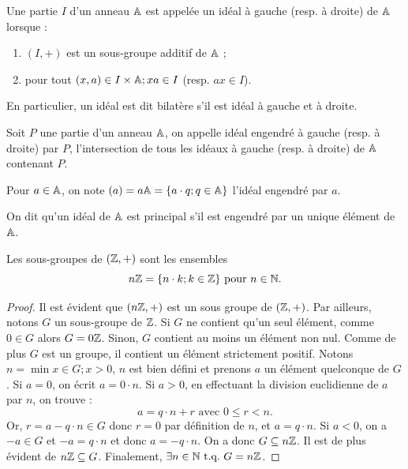 \begin{defn}[Idéal]
Une partie $I$ d'un anneau $\mathbb{A}$ est appelée un idéal à gauche (resp. à droite) de $\mathbb{A}$ lorsque :
\begin{enumerate}[label=(\roman*)]
\item $(I,+)$ est un sous-groupe additif de $\mathbb{A}$ ;
\item pour tout $(x, a) \in I \times \mathbb{A} ; xa \in I$ (resp. $ax \in I$). 
\end{enumerate}
En particulier, un idéal est dit bilatère s'il est idéal à gauche et à droite.
\end{defn}

\begin{defn}
Soit $P$ une partie d'un anneau $\mathbb{A}$, on appelle idéal engendré à gauche (resp. à droite) par $P$,
l'intersection de tous les idéaux à gauche (resp. à droite) de $\mathbb{A}$ contenant $P$.
\end{defn}

\begin{nota}
Pour $a \in \mathbb{A}$, on note $(a) = a \mathbb{A} = \{a \cdot q ; q\in \mathbb{A}\}$ l'idéal engendré par $a$.
\end{nota}

\begin{defn}
On dit qu'un idéal de $\mathbb{A}$ est principal s'il est engendré par un unique élément de $\mathbb{A}$.
\end{defn}

\begin{lem}
\label{lem:nZ}
Les sous-groupes de $(\mathbb{Z},+)$ sont les ensembles
\[ n\mathbb{Z} = \{ n \cdot k ; k \in \mathbb{Z}  \} \text{~pour~} n \in \mathbb{N} . \]
\end{lem}

\begin{proof}
Il est évident que $(n\mathbb{Z}, +)$ est un sous groupe de $(\mathbb{Z},+)$. Par ailleurs, notons $G$ un sous-groupe de $\mathbb{Z}$.
Si $G$ ne contient qu'un seul élément, comme $0 \in G$ alors $G = 0\mathbb{Z}$. 
Sinon, $G$ contient au moins un élément non nul. Comme de plus $G$ est un groupe, il contient un élément strictement positif.
Notons $n = \min{ x \in G ; x > 0 }$, $n$ est bien défini et prenons $a$ un élément quelconque de $G$.
Si $a=0$, on écrit $a=0\cdot n$. Si $a >0$, en effectuant la division euclidienne de $a$ par $n$, on trouve :
\[ a = q \cdot n + r \text{~avec~} 0 \leq r < n . \]
Or, $r = a - q \cdot n \in G$ donc $r=0$ par définition de $n$, et $a = q \cdot n$.
Si $a<0$, on a $-a \in G$ et $-a = q \cdot n$ et donc $a=-q \cdot n$. 
On a donc $G \subseteq n\mathbb{Z}$. Il est de plus évident de $n\mathbb{Z} \subseteq G$.
Finalement, $\exists n \in \mathbb{N} \text{~t.q.~} G = n\mathbb{Z}$. 
\end{proof}

